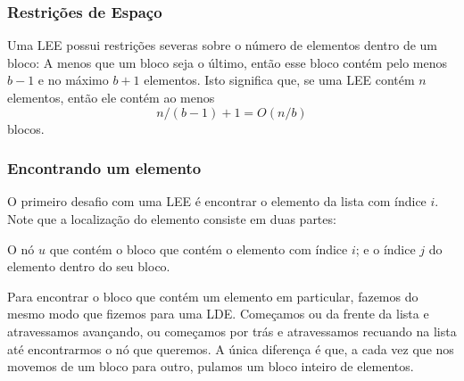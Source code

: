 \documentclass{beamer}
\begin{document}
\begin{frame}
\frametitle{Restrições de Espaço}
Uma LEE possui restrições severas sobre o número de elementos dentro de um bloco: A menos que um bloco seja o último, então esse bloco contém
pelo menos $\ensuremath{\ensuremath{\ensuremath{\mathit{b}}}}-1$ e no máximo $\ensuremath{\ensuremath{\ensuremath{\mathit{b}}}}+1$ elementos.  Isto significa que, se uma LEE contém \ensuremath{\ensuremath{\ensuremath{\mathit{n}}}} elementos, então ele contém ao menos
\[
    \ensuremath{\ensuremath{\ensuremath{\mathit{n}}}}/(\ensuremath{\ensuremath{\ensuremath{\mathit{b}}}}-1) + 1 = O(\ensuremath{\ensuremath{\ensuremath{\mathit{n}}}}/\ensuremath{\ensuremath{\ensuremath{\mathit{b}}}})
\]
blocos.
\end{frame}

\begin{frame}
\frametitle{Encontrando um elemento}
 O primeiro desafio com uma LEE é encontrar o elemento da lista com índice $ \ensuremath{\ensuremath{\mathit{i}}}$. Note que a localização do elemento consiste em duas partes:

    O nó $ \ensuremath{\ensuremath{\mathit{u}}}$ que contém o bloco que contém o elemento com índice $ \ensuremath{\ensuremath{\mathit{i}}}$; e
    o índice $ \ensuremath{\ensuremath{\mathit{j}}}$ do elemento dentro do seu bloco.

Para encontrar o bloco que contém um elemento em particular, fazemos do mesmo modo que fizemos para uma LDE. Começamos ou da frente da lista e atravessamos avançando, ou começamos por trás e atravessamos recuando na lista até encontrarmos o nó que queremos. A única diferença é que, a cada vez que nos movemos de um bloco para outro, pulamos um bloco inteiro de elementos.

\end{frame}
\end{document}
